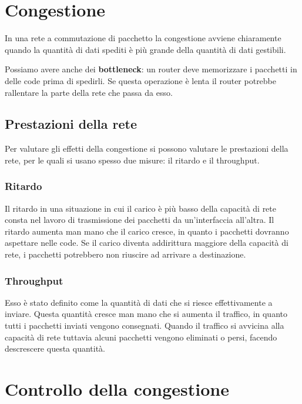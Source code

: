 \section{Congestione}
    In una rete a commutazione di pacchetto la congestione avviene chiaramente quando la quantità di dati spediti è più grande della quantità di dati gestibili.
    
    Possiamo avere anche dei \textbf{bottleneck}: un router deve memorizzare i pacchetti in delle code prima di spedirli. Se questa operazione è lenta il router potrebbe rallentare la parte della rete che passa da esso.
    
    \subsection{Prestazioni della rete}
        Per valutare gli effetti della congestione si possono valutare le prestazioni della rete, per le quali si usano spesso due misure: il ritardo e il throughput.
        
        \subsubsection{Ritardo}
            Il ritardo in una situazione in cui il carico è più basso della capacità di rete consta nel lavoro di trasmissione dei pacchetti da un'interfaccia all'altra. Il ritardo aumenta man mano che il carico cresce, in quanto i pacchetti dovranno aspettare nelle code. Se il carico diventa addirittura maggiore della capacità di rete, i pacchetti potrebbero non riuscire ad arrivare a destinazione.
            
        \subsubsection{Throughput}
            Esso è stato definito come la quantità di dati che si riesce effettivamente a inviare. Questa quantità cresce man mano che si aumenta il traffico, in quanto tutti i pacchetti inviati vengono consegnati. Quando il traffico si avvicina alla capacità di rete tuttavia alcuni pacchetti vengono eliminati o persi, facendo descrescere questa quantità.
            
\section{Controllo della congestione}
    